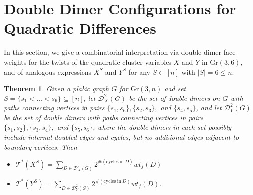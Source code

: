 \documentclass[11pt]{article}
\newtheorem{theorem}[theo]{Theorem}
\theoremstyle{definition}
\numberwithin{equation}{section}
\def\Gr {{\textrm{Gr}}}
\numberwithin{equation}{section}
\begin{document}
\section{Double Dimer Configurations for Quadratic Differences}\label{section:doubledimers}
In this section, we give a combinatorial interpretation via double dimer face weights for the twists of the quadratic cluster variables $X$ and $Y$ in $\Gr(3,6)$, and of analogous expressions $X^S$ and $Y^S$ for any $S \subset [n]$ with $|S|=6 \leq n$.


\begin{theorem}\label{theorem:doubledimersXY}
Given a plabic graph $G$ for $\Gr(3,n)$ and set $S=\{s_1<\dots<s_6\} \subseteq [n]$, let $\mathcal{D}^2_X(G)$ be the set of double dimers on $G$ with paths connecting vertices in pairs $\{s_1,s_6\},\{s_2,s_3\},$ and $\{s_4,s_5\}$, and let $\mathcal{D}^2_Y(G)$ be the set of double dimers with paths connecting vertices in pairs $\{s_1,s_2\},\{s_3,s_4\},$ and $\{s_5,s_6\}$, where the double dimers in each set possibly include internal doubled edges and cycles, but no additional edges adjacent to boundary vertices. Then
\begin{itemize}
    \item $\mathcal{T}^*(X^S)=\sum_{D \in \mathcal{D}^2_X(G)} 2^{\#( \mathrm{cycles~in~}D)} wt_f(D)$
    \item $\mathcal{T}^*(Y^S)=\sum_{D \in \mathcal{D}^2_Y(G)} 2^{\#( \mathrm{cycles~in~}D)} wt_f(D).$
\end{itemize}
\end{theorem}
\end{document}
